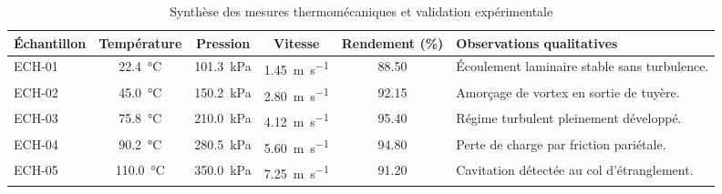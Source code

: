 \begin{table}[htbp]
  \centering
  \small
  \caption{Synthèse des mesures thermomécaniques et validation expérimentale}
  \label{tab:synthese_mesures}
  \begin{tabularx}{\textwidth}{l c c c S[table-format=3.2] Y}
    \toprule
    \textbf{Échantillon} & \textbf{Température} & \textbf{Pression} & \textbf{Vitesse} & {\textbf{Rendement (\%)}} & \textbf{Observations qualitatives} \\
    \midrule
    ECH-01 & \qty{22.4}{\degreeCelsius} & \qty{101.3}{\kilo\pascal} & \qty{1.45}{\meter\per\second} & 88.50 & Écoulement laminaire stable sans turbulence. \\
    ECH-02 & \qty{45.0}{\degreeCelsius} & \qty{150.2}{\kilo\pascal} & \qty{2.80}{\meter\per\second} & 92.15 & Amorçage de vortex en sortie de tuyère. \\
    ECH-03 & \qty{75.8}{\degreeCelsius} & \qty{210.0}{\kilo\pascal} & \qty{4.12}{\meter\per\second} & 95.40 & Régime turbulent pleinement développé. \\
    \addlinespace
    ECH-04 & \qty{90.2}{\degreeCelsius} & \qty{280.5}{\kilo\pascal} & \qty{5.60}{\meter\per\second} & 94.80 & Perte de charge par friction pariétale. \\
    ECH-05 & \qty{110.0}{\degreeCelsius} & \qty{350.0}{\kilo\pascal} & \qty{7.25}{\meter\per\second} & 91.20 & Cavitation détectée au col d'étranglement. \\
    \bottomrule
  \end{tabularx}
\end{table}


